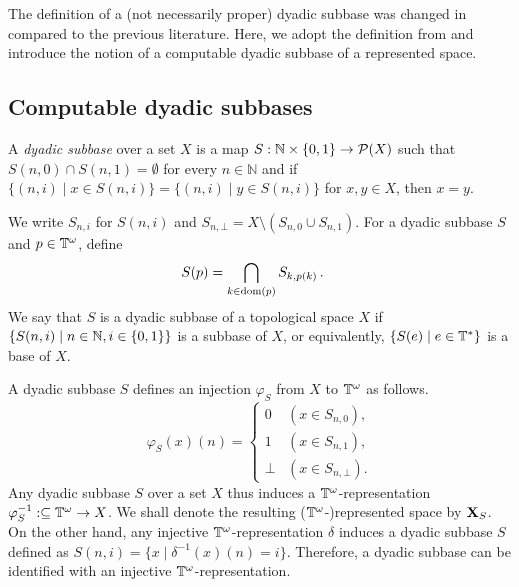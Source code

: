 \documentclass{eptcs-modified}
\begin{document}
The definition of a (not necessarily proper) dyadic subbase was changed in \cite{TsukamotoTsuiki:2016} compared to the previous literature.  Here, we adopt the definition from \cite{TsukamotoTsuiki:2016} and introduce the notion of a computable dyadic subbase of a represented space.

\subsection{Computable dyadic subbases}

\begin{definition}\rm\label{def:dyadicsubbase}
A \emph{dyadic subbase} over a set $X$ is
a map $S : {\mathbb N} \times \{0,1\} \to \mathcal{P}(X)$ such that $S(n,0) \cap S(n,1) = \emptyset$ for every $n \in \mathbb N$ and if $\{(n,i) \mid x \in S(n,i)\} = \{(n,i) \mid y \in S(n,i)\}$ for $x, y \in X$, then $x = y$.
\end{definition}

We write $S_{n,i}$ for $S(n,i)$ and $S_{n,{\bot}} = X \setminus (S_{n,0} \cup S_{n,1})$.
For a dyadic subbase $S$ and $p \in \mathbb{T}^{\omega}$, define
\begin{align}
&S(p)=\bigcap_{k \in \operatorname{dom}(p)}S_{k,p(k)}\, .
\end{align}
We say that $S$ is a dyadic subbase of a topological space $X$ if $\{S(n, i) \mid n \in \mathbb{N}, i \in \{0,1\}\}$ is a subbase of $X$, or equivalently,
$\{S(e) \mid e \in \mathbb{T}^*\}$ is a base of $X$.

A dyadic subbase $S$ defines an injection
$\varphi_S$ from $X$ to $\mathbb{T}^\omega$ as follows.
$$
\varphi_{S}(x)(n) = \left\{\begin{array}{ll}
0 &( x \in S_{n,0}),\\
1 &( x \in S_{n,1}),\\
\bot &(x \in S_{n,\bot}).
\end{array}
\right.
$$
Any dyadic subbase $S$ over a set $X$ thus induces a $\mathbb{T}^\omega$-representation $\varphi^{-1}_S : \subseteq \mathbb{T}^\omega \to X$. We shall denote the resulting ($\mathbb{T}^\omega$-)represented space by $\mathbf{X}_S$.
On the other hand, any injective $\mathbb{T}^\omega$-representation $\delta$ induces a dyadic subbase $S$
  defined as $S(n, i) = \{x \mid \delta^{-1}(x)(n) = i \}$. Therefore, a dyadic subbase can be identified with an injective $\mathbb{T}^\omega$-representation.
\end{document}
